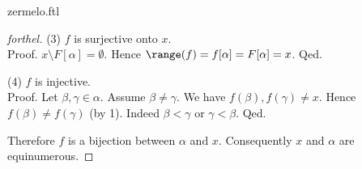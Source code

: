 \documentclass{naproche-library}
\begin{document}
\begin{smodule}{zermelo.ftl}
\begin{proof}[forthel]
    (3) $f$ is surjective onto $x$. \\
    Proof.
      $x \setminus F[\alpha] = \emptyset$.
      Hence $\range(f)
        = f[\alpha]
        = F[\alpha]
        = x$.
    Qed.

    (4) $f$ is injective. \\
    Proof.
      Let $\beta, \gamma \in \alpha$.
      Assume $\beta \neq \gamma$.
      We have $f(\beta), f(\gamma) \neq x$.
      Hence $f(\beta) \neq f(\gamma)$ (by 1).
      Indeed $\beta < \gamma$ or $\gamma < \beta$.
    Qed.

    Therefore $f$ is a bijection between $\alpha$ and $x$.
    Consequently $x$ and $\alpha$ are equinumerous.
  \end{proof}
\end{smodule}
\end{document}

